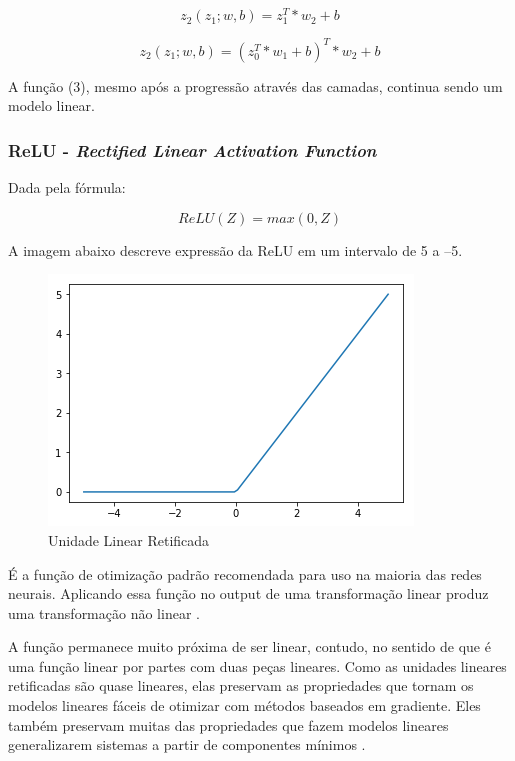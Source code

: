 \documentclass[12pt]{article}
\begin{document}
\begin{equation}
    z_2(z_1; w, b) = z_1^T * w_2 + b
\end{equation}

\begin{equation}
    z_2(z_1; w, b) = (z_0^T * w_1 + b)^T * w_2 + b
\end{equation}

A função (3), mesmo após a progressão através das camadas, continua sendo um modelo linear.

\subsubsection{ReLU - \textit{Rectified Linear Activation Function}}

Dada pela fórmula:

\begin{equation}
    ReLU(Z) = max(0, Z)
\end{equation}

A imagem abaixo descreve expressão da ReLU em um intervalo de 5 a –5.

\begin{figure}[!htb]
\centering
\includegraphics[width=.5\textwidth]{images/relu.png}
\caption{Unidade Linear Retificada}
\label{fig:relu}
\end{figure}

É a função de otimização padrão recomendada para uso na maioria das redes neurais. Aplicando essa função no output de uma transformação linear produz uma transformação não linear \cite{nair2010rectified}.

A função permanece muito próxima de ser linear, contudo, no sentido de que é uma função linear por partes com duas peças lineares. Como as unidades lineares retificadas são quase lineares, elas preservam as propriedades que tornam os modelos lineares fáceis de otimizar com métodos baseados em gradiente. Eles também preservam muitas das propriedades que fazem modelos lineares generalizarem sistemas a partir de componentes mínimos \cite{Goodfellow-et-al-2016}.
\end{document}
